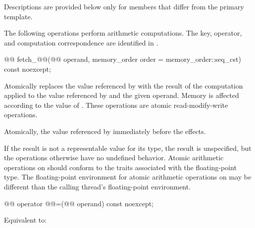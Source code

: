 \pnum
Descriptions are provided below only for members
that differ from the primary template.

\pnum
The following operations perform arithmetic computations.
The key, operator, and computation correspondence are identified
in .

%
%
\begin{itemdecl}
@@ fetch_@@(@@ operand,
                          memory_order order = memory_order::seq_cst) const noexcept;
\end{itemdecl}

\begin{itemdescr}
\pnum
\effects
Atomically replaces the value referenced by  with
the result of the computation applied to the value referenced by 
and the given operand.
Memory is affected according to the value of .
These operations are atomic read-modify-write operations.

\pnum
\returns
Atomically, the value referenced by 
immediately before the effects.

\pnum
\remarks
If the result is not a representable value for its type,
the result is unspecified,
but the operations otherwise have no undefined behavior.
Atomic arithmetic operations on  should conform to
the  traits
associated with the floating-point type.
The floating-point environment
for atomic arithmetic operations on 
may be different than the calling thread's floating-point environment.
\end{itemdescr}

%
%
\begin{itemdecl}
@@ operator @@=(@@ operand) const noexcept;
\end{itemdecl}

\begin{itemdescr}
\effects
Equivalent to:
\end{itemdescr}

